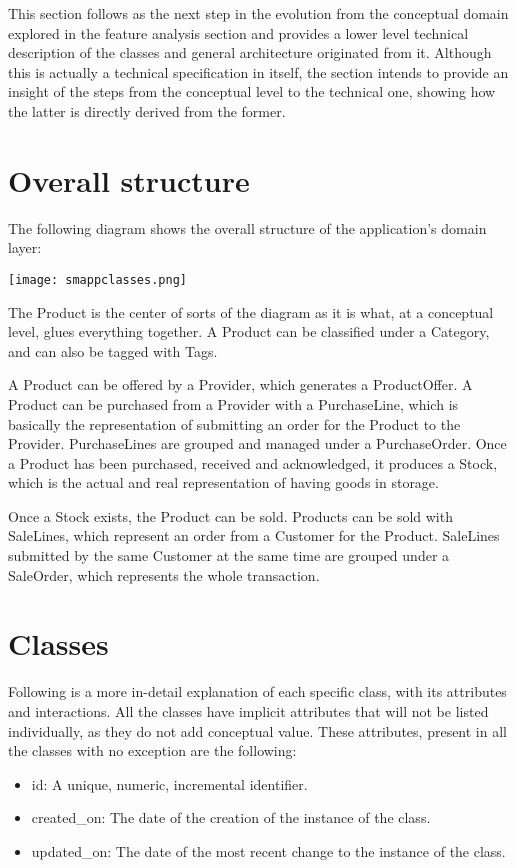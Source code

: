 This section follows as the next step in the evolution from the conceptual domain explored in the feature analysis section and provides a lower level technical description of the classes and general architecture originated from it. Although this is actually a technical specification in itself, the section intends to provide an insight of the steps from the conceptual level to the technical one, showing how the latter is directly derived from the former.

\section{Overall structure}
The following diagram shows the overall structure of the application’s domain layer:

\texttt{[image: smappclasses.png]}

The Product is the center of sorts of the diagram as it is what, at a conceptual level, glues everything together. A Product can be classified under a Category, and can also be tagged with Tags.

A Product can be offered by a Provider, which generates a ProductOffer. A Product can be purchased from a Provider with a PurchaseLine, which is basically the representation of submitting an order for the Product to the Provider. PurchaseLines are grouped and managed under a PurchaseOrder. Once a Product has been purchased, received and acknowledged, it produces a Stock, which is the actual and real representation of having goods in storage.

Once a Stock exists, the Product can be sold. Products can be sold with SaleLines, which represent an order from a Customer for the Product. SaleLines submitted by the same Customer at the same time are grouped under a SaleOrder, which represents the whole transaction.

\section{Classes}
Following is a more in-detail explanation of each specific class, with its attributes and interactions. All the classes have implicit attributes that will not be listed individually, as they do not add conceptual value. These attributes, present in all the classes with no exception are the following:

\begin{itemize}
\item id: A unique, numeric, incremental identifier.
\item created\_on: The date of the creation of the instance of the class.
\item updated\_on: The date of the most recent change to the instance of the class.
\end{itemize}

